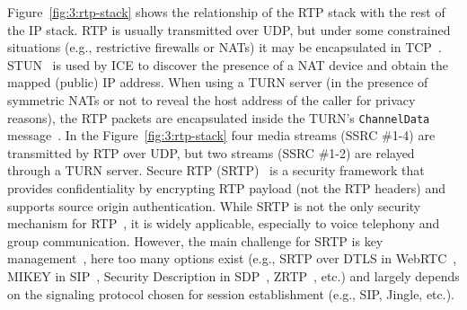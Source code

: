 Figure~\ref{fig:3:rtp-stack} shows the relationship of the RTP stack with the
rest of the IP stack. RTP is usually transmitted over UDP, but under some
constrained situations (e.g., restrictive firewalls or NATs) it may be
encapsulated in TCP~\cite{rfc3550}. STUN~\cite{rfc5389} is used by ICE to
discover the presence of a NAT device and obtain the mapped (public) IP
address. When using a TURN server (in the presence of symmetric NATs or not to
reveal the host address of the caller for privacy reasons), the RTP packets
are encapsulated inside the TURN's \texttt{ChannelData}
message~\cite{rfc5766}. In the Figure~\ref{fig:3:rtp-stack} four media streams
(SSRC \#1-4) are transmitted by RTP over UDP, but two streams (SSRC \#1-2) are
relayed through a TURN server. Secure RTP (SRTP)~\cite{rfc3611} is a security
framework that provides confidentiality by encrypting RTP payload (not the RTP
headers) and supports source origin authentication. While SRTP is not the only
security mechanism for RTP~\cite{draft.srtp-not-must}, it is widely
applicable, especially to voice telephony and group communication. However,
the main challenge for SRTP is key management~\cite{draft.sec-opts}, here too
many options exist (e.g., SRTP over DTLS in WebRTC~\cite{rfc5763}, MIKEY in
SIP~\cite{rfc3830}, Security Description in SDP~\cite{rfc4566},
ZRTP~\cite{RFC6189}, etc.) and largely depends on the signaling protocol
chosen for session establishment (e.g., SIP, Jingle, etc.).